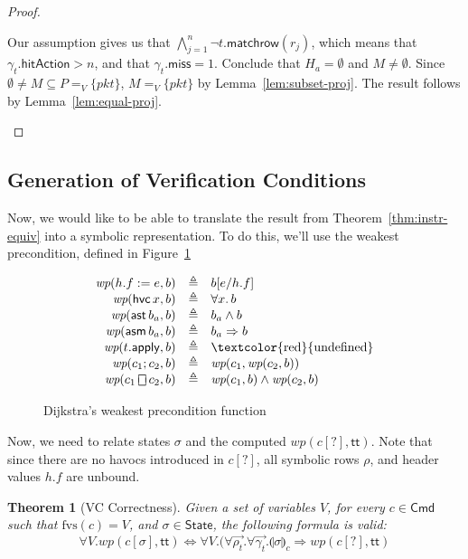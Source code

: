 \documentclass{article}
\newcommand{\pkt}{\mathit{pkt}}
\newcommand{\TRUE}{\mathsf{tt}}
\newcommand{\Cmd}{\mathsf{Cmd}}
\newcommand{\State}{\mathsf{State}}
\newcommand{\hitAction}{\mathsf{hitAction}}
\newcommand{\miss}{\mathsf{miss}}
\newcommand{\assert}{\mathop{\mathsf{ast}}}
\newcommand{\assume}{\mathop{\mathsf{asm}}}
\newcommand{\apply}{\mathsf{apply}}
\newcommand{\choiceop}{\rotatebox[origin=c]{90}{$\sqsubset\!\!\!\sqsupset$}}
\newcommand{\choice}{\mathbin{\choiceop}}
\newcommand{\havoc}[1]{\mathop{\mathsf{hvc}}#1}
\newcommand{\WP}{\textit{wp}}
\newcommand{\state}[1]{\llparenthesis#1\rrparenthesis}
\newcommand{\instr}{[?]}
\newcommand{\fvs}{\textrm{fvs}}
\newcommand{\matchrow}{\mathsf{matchrow}}
\newtheorem{theorem}{Theorem}
\begin{document}
\begin{proof}
\begin{enumerate}[align=left]
\begin{enumerate}
        Our assumption gives us that $\bigwedge_{j=1}^n \neg t.\matchrow(r_j)$,
        which means that $\gamma_t.\hitAction > n$, and that $\gamma_t.\miss =
        1$. Conclude that $H_a = \emptyset$ and $M \neq \emptyset$. Since
        $\emptyset \neq M \subseteq P =_V \{\pkt\}$, $M =_V \{\pkt\}$ by
        Lemma~\ref{lem:subset-proj}. The result follows by
        Lemma~\ref{lem:equal-proj}.
    \end{enumerate}

  \end{enumerate}
\end{proof}

\subsection{Generation of Verification Conditions}

Now, we would like to be able to translate the result from
Theorem~\ref{thm:instr-equiv} into a symbolic representation. To do this, we'll
use the weakest precondition, defined in Figure~\ref{fig:wp}

\begin{figure}[H]
  \[
  \begin{array}{r >{\triangleq}c l}
    \WP(h.f := e, b)
    && b[e/h.f] \\
    \WP(\havoc x, b)
    && \forall x.\,b \\
    \WP(\assert b_a, b)
    && b_a \wedge b \\
    \WP(\assume b_a, b)
    && b_a \Rightarrow b \\
    \WP(t.\apply,b) && \textrm{\textcolor{red}{undefined}} \\
    \WP(c_1;c_2, b)
    && \WP(c_1,\WP(c_2,b)) \\
    \WP(c_1 \choice c_2, b)
    && \WP(c_1,b) \wedge \WP(c_2,b)
  \end{array}
  \]
  \caption{Dijkstra's weakest precondition function}
  \label{fig:wp}
\end{figure}

Now, we need to relate states $\sigma$ and the computed $\WP(c\instr,\TRUE)$.
Note that since there are no havocs introduced in $c\instr$, all symbolic rows
$\rho$, and header values $h.f$ are unbound.

\begin{theorem}[VC Correctness]
  \label{thm:vc-correct}
  Given a set of variables $V$, for every $c \in \Cmd$ such that $\fvs(c) = V$,
  and $\sigma \in \State$, the following formula is valid:
  \[ \forall V. \WP(c[\sigma], \TRUE) \iff \forall V. (\forall \vec{\rho_t}. \forall \vec{\gamma_t}. \state\sigma_c \Rightarrow  \WP(c\instr,\TRUE)\]
\end{theorem}
\end{document}
